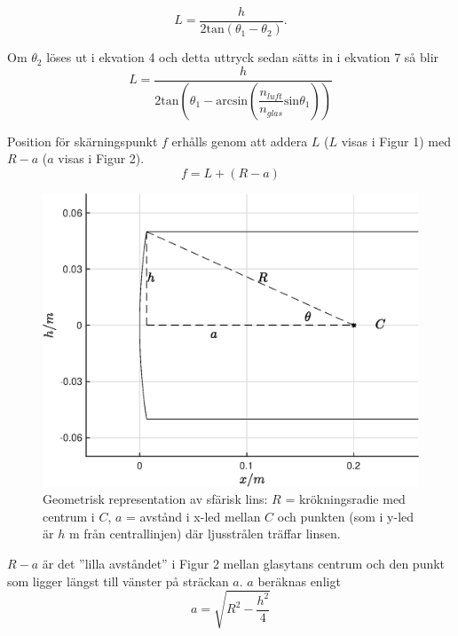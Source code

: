 \begin{equation} \label{eq:L}
    L = \dfrac{h}{2\text{tan}(\theta_1-\theta_2)}.
\end{equation}

Om $\theta_2$ löses ut i ekvation 4 och detta uttryck sedan sätts in i ekvation 7 så blir
\begin{equation} \label{eq:L_2}
    L = \dfrac{h}{2\text{tan}\left(\theta_1-
    \text{arcsin}\left(\dfrac{n_{luft}}{n_{glas}}
    \text{sin}\theta_1\right)\right)}
\end{equation}


Position för skärningspunkt $f$ erhålls genom att addera $L$ ($L$ visas i Figur 1) med $R-a$ ($a$ visas i Figur 2).
\begin{equation} \label{eq:focal}
    f = L + (R-a)
\end{equation}
\begin{figure}[H]
    \centering
    \captionsetup{justification=centering,margin=2cm}
    \includegraphics[scale=0.7]{Resources/Graphics/fig4_1.eps}
    \caption{Geometrisk representation av sfärisk lins: $R$ = krökningsradie med centrum i $C$, $a$ = avstånd i x-led mellan $C$ och punkten (som i y-led är $h$ m från centrallinjen) där ljusstrålen träffar linsen.}
    \label{fig:4_1}
\end{figure}


$R-a$ är det ''lilla avståndet'' i Figur 2 mellan glasytans centrum och den punkt som ligger längst till vänster på sträckan $a$. $a$ beräknas enligt
\begin{equation} \label{eq:a} 
    a = \sqrt{R^2-\dfrac{h^2}{4}}
\end{equation}

